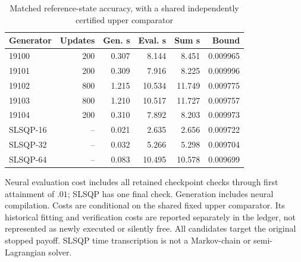 \begin{table}[htbp]
\centering\small
\caption{Matched reference-state accuracy, with a shared independently certified upper comparator}\label{tab:r19frontier}
\begin{tabular}{lrrrrr}\toprule
Generator & Updates & Gen. s & Eval. s & Sum s & Bound\\
\midrule
19100 & 200 & 0.307 & 8.144 & 8.451 & 0.009965\\
19101 & 200 & 0.309 & 7.916 & 8.225 & 0.009996\\
19102 & 800 & 1.215 & 10.534 & 11.749 & 0.009775\\
19103 & 800 & 1.210 & 10.517 & 11.727 & 0.009757\\
19104 & 200 & 0.310 & 7.892 & 8.203 & 0.009973\\
SLSQP-16 & -- & 0.021 & 2.635 & 2.656 & 0.009722\\
SLSQP-32 & -- & 0.032 & 5.266 & 5.298 & 0.009704\\
SLSQP-64 & -- & 0.083 & 10.495 & 10.578 & 0.009699\\
\bottomrule
\end{tabular}
\par\smallskip\begin{minipage}{.98\textwidth}\footnotesize Neural evaluation cost includes all retained checkpoint checks through first attainment of $.01$; SLSQP has one final check. Generation includes neural compilation. Costs are conditional on the shared fixed upper comparator. Its historical fitting and verification costs are reported separately in the ledger, not represented as newly executed or silently free. All candidates target the original stopped payoff. SLSQP time transcription is not a Markov-chain or semi-Lagrangian solver.\end{minipage}
\end{table}
